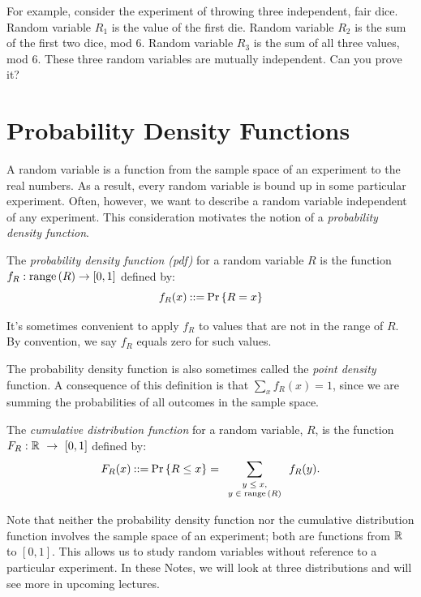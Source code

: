 \documentclass[11pt,twoside]{article}
\begin{document}
For example, consider the experiment of throwing three independent, fair
dice.  Random variable $R_1$ is the value of the first die.  Random
variable $R_2$ is the sum of the first two dice, mod 6.  Random variable
$R_3$ is the sum of all three values, mod 6.  These three random variables
are mutually independent.  Can you prove it?

\section{Probability Density Functions}

A random variable is a function from the sample space of an experiment to
the real numbers.  As a result, every random variable is bound up in some
particular experiment.  Often, however, we want to describe a random
variable independent of any experiment.  This consideration motivates the
notion of a \emph{probability density function}.


\begin{definition}
The \emph{probability density function (pdf)} for a random variable $R$ is
the function $f_R : \mathop{\textup{range}}\nolimits\left(R\right) \to [0,1]$ defined by:
\[
f_R(x) \mathbin{::=} \mathop{\textup{Pr}}\nolimits\left\{R = x\right\}
\]
\end{definition}
It's sometimes convenient to apply $f_R$ to values that are not in the
range of $R$.  By convention, we say $f_R$ equals zero for such values.

The probability density function is also sometimes called the
\emph{point density} function.  A consequence of this definition is
that $\sum_x f_R(x) = 1$, since we are summing the probabilities of all
outcomes in the sample space.

\begin{definition}
The \emph{cumulative distribution function} for a random variable, $R$, is
the function $F_R: \mathbb{R}~\to~[0,1]$ defined by:
\[
F_R(x) \mathbin{::=} \mathop{\textup{Pr}}\nolimits\left\{R \leq x\right\} = \sum_{\text{\scriptsize{$\begin{array}{c}
                                         y \leq x,\\
                                         y \in \mathop{\textup{range}}\nolimits\left(R\right)
                                         \end{array}$}}}   f_R(y).
\]
\end{definition}
Note that neither the probability density function nor the cumulative
distribution function involves the sample space of an experiment; both are
functions from $\mathbb{R}$ to $[0,1]$.  This allows us to study random
variables without reference to a particular experiment.  In these Notes,
we will look at three distributions and will see more in upcoming
lectures.
\end{document}
